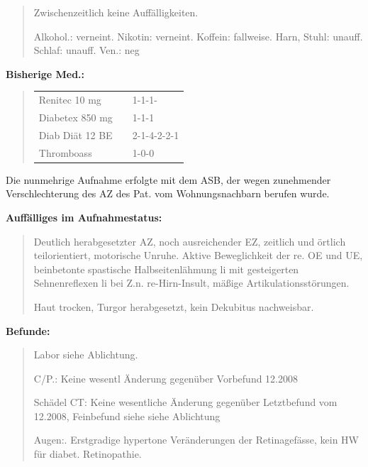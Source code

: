{\begin{quote}
  Zwischenzeitlich keine Auffälligkeiten.
  
  Alkohol.: verneint. Nikotin: verneint. Koffein: fallweise. Harn, Stuhl: unauff.
  Schlaf: unauff. Ven.: neg
\end{quote}


{\bfseries Bisherige Med.:} 

\begin{quote}
  \begin{tabular}{lll}
Renitec 10 mg &&1-1-1-
\\
Diabetex 850 mg &&1-1-1
\\
Diab Diät 12 BE &&2-1-4-2-2-1
\\
Thromboass &&1-0-0
\\
\end{tabular}
\end{quote}





 Die nunmehrige Aufnahme erfolgte mit dem ASB, der wegen zunehmender
 Verschlechterung des AZ des Pat. vom Wohnungsnachbarn berufen wurde.

{\bfseries Auffälliges im Aufnahmestatus:}

\begin{quote}
 Deutlich herabgesetzter AZ, noch ausreichender EZ, zeitlich und örtlich
 teilorientiert, motorische Unruhe. Aktive Beweglichkeit der re.
 OE und UE, beinbetonte
 spastische Halbseitenlähmung li mit gesteigerten Sehnenreflexen li bei Z.n. re-Hirn-Insult, mäßige Artikulationsstörungen.
 
 Haut trocken, Turgor herabgesetzt, kein
 Dekubitus nachweisbar.
 \end{quote}

{\bfseries Befunde:}
\begin{quote}
Labor siehe Ablichtung.

C/P.: Keine wesentl Änderung
gegenüber Vorbefund 12.2008

Schädel CT: Keine wesentliche Änderung gegenüber Letztbefund vom 12.2008,
Feinbefund siehe siehe Ablichtung

Augen:. Erstgradige hypertone Veränderungen der
Retinagefässe, kein HW für
diabet. Retinopathie.


\end{quote}}
